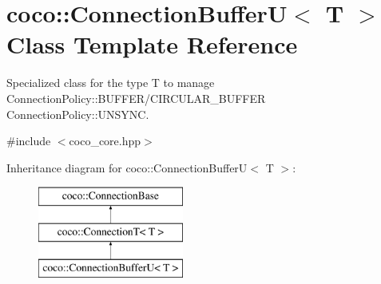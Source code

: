 \hypertarget{classcoco_1_1_connection_buffer_u}{}\section{coco\+:\+:Connection\+Buffer\+U$<$ T $>$ Class Template Reference}
\label{classcoco_1_1_connection_buffer_u}


Specialized class for the type T to manage Connection\+Policy\+::\+B\+U\+F\+F\+E\+R/\+C\+I\+R\+C\+U\+L\+A\+R\+\_\+\+B\+U\+F\+F\+E\+R Connection\+Policy\+::\+U\+N\+S\+Y\+N\+C.  




{\ttfamily \#include $<$coco\+\_\+core.\+hpp$>$}

Inheritance diagram for coco\+:\+:Connection\+Buffer\+U$<$ T $>$\+:\begin{figure}[H]
\begin{center}
\leavevmode
\includegraphics[height=3.000000cm]{classcoco_1_1_connection_buffer_u}
\end{center}
\end{figure}

